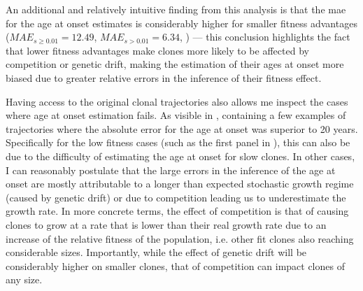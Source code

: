 An additional and relatively intuitive finding from this analysis is that the \ac{mae} for the age at onset estimates is considerably higher for smaller fitness advantages ($MAE_{s \geq 0.01} = 12.49$, $MAE_{s > 0.01} = 6.34$, ) --- this conclusion highlights the fact that lower fitness advantages make clones more likely to be affected by competition or genetic drift, making the estimation of their ages at onset more biased due to greater relative errors in the inference of their fitness effect. 

\begin{figure}[h]
	\label{fig:age-at-onset-vs-true-fitness-sim}
\end{figure}

Having access to the original clonal trajectories also allows me inspect the cases where age at onset estimation fails. As visible in , containing a few examples of trajectories where the absolute error for the age at onset was superior to 20 years. Specifically for the low fitness cases (such as the first panel in ), this can also be due to the difficulty of estimating the age at onset for slow clones. In other cases, I can reasonably postulate that the large errors in the inference of the age at onset are mostly attributable to a longer than expected stochastic growth regime (caused by genetic drift) or due to competition leading us to underestimate the growth rate. In more concrete terms, the effect of competition is that of causing clones to grow at a rate that is lower than their real growth rate due to an increase of the relative fitness of the population, i.e. other fit clones also reaching considerable sizes. Importantly, while the effect of genetic drift will be considerably higher on smaller clones, that of competition can impact clones of any size.

\begin{figure}[h]
	\label{fig:examples-bad-inference}
\end{figure}

